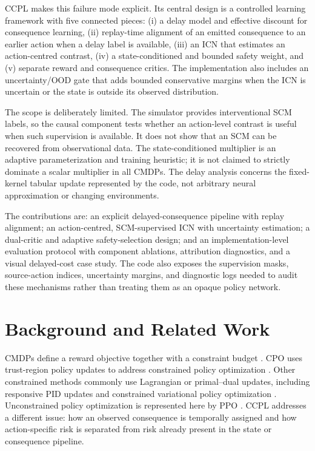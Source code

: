 \documentclass[10pt]{article}
\begin{document}
CCPL makes this failure mode explicit. Its central design is a controlled
learning framework with five connected pieces: (i) a delay model and effective
discount for consequence learning, (ii) replay-time alignment of an emitted
consequence to an earlier action when a delay label is available, (iii) an ICN
that estimates an action-centred contrast, (iv) a state-conditioned and bounded
safety weight, and (v) separate reward and consequence critics. The
implementation also includes an uncertainty/OOD gate that adds bounded
conservative margins when the ICN is uncertain or the state is outside its
observed distribution.

The scope is deliberately limited. The simulator provides interventional SCM
labels, so the causal component tests whether an action-level contrast is
useful when such supervision is available. It does not show that an SCM can
be recovered from observational data. The state-conditioned multiplier is an
adaptive parameterization and training heuristic; it is not claimed to
strictly dominate a scalar multiplier in all CMDPs. The delay analysis
concerns the fixed-kernel tabular update represented by the code, not arbitrary
neural approximation or changing environments.

The contributions are: an explicit delayed-consequence pipeline with replay
alignment; an action-centred, SCM-supervised ICN with uncertainty estimation;
a dual-critic and adaptive safety-selection design; and an implementation-level
evaluation protocol with component ablations, attribution diagnostics, and a
visual delayed-cost case study. The code also exposes the supervision masks,
source-action indices, uncertainty margins, and diagnostic logs needed to
audit these mechanisms rather than treating them as an opaque policy network.

\section{Background and Related Work}
CMDPs define a reward objective together with a constraint budget
\citep{altman1999}. CPO uses trust-region policy updates to address constrained
policy optimization \citep{achiam2017}. Other constrained methods commonly use
Lagrangian or primal--dual updates, including responsive PID updates
\citep{stooke2020} and constrained variational policy optimization
\citep{liu2022cvpo}. Unconstrained policy optimization is represented here by
PPO \citep{schulman2017ppo}. CCPL addresses a different issue: how an
observed consequence is temporally assigned and how action-specific risk is
separated from risk already present in the state or consequence pipeline.
\end{document}
